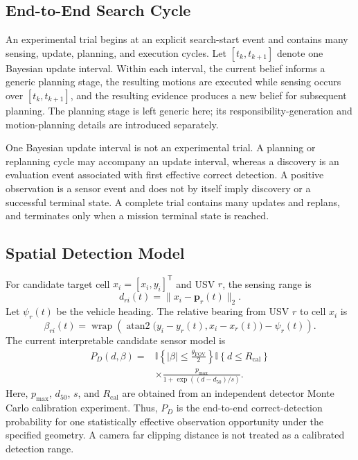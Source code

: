 \documentclass[letterpaper, 10pt, conference]{ieeeconf}
\begin{document}
\subsection{End-to-End Search Cycle}

An experimental trial begins at an explicit search-start event and contains many sensing, update, planning, and execution cycles. Let \([t_k,t_{k+1}]\) denote one Bayesian update interval. Within each interval, the current belief informs a generic planning stage, the resulting motions are executed while sensing occurs over \([t_k,t_{k+1}]\), and the resulting evidence produces a new belief for subsequent planning. The planning stage is left generic here; its responsibility-generation and motion-planning details are introduced separately.

One Bayesian update interval is not an experimental trial. A planning or replanning cycle may accompany an update interval, whereas a discovery is an evaluation event associated with first effective correct detection. A positive observation is a sensor event and does not by itself imply discovery or a successful terminal state. A complete trial contains many updates and replans, and terminates only when a mission terminal state is reached.

\subsection{Spatial Detection Model}

For candidate target cell \(x_i=[x_i,y_i]^\mathsf{T}\) and USV \(r\), the sensing range is
\begin{equation}
  d_{ri}(t) = \lVert x_i - \mathbf{p}_r(t) \rVert_2.
  \label{eq:sensing_range}
\end{equation}
Let \(\psi_r(t)\) be the vehicle heading. The relative bearing from USV \(r\) to cell \(x_i\) is
\begin{equation}
  \beta_{ri}(t) = \operatorname{wrap}\!\left(
  \operatorname{atan2}\!\bigl(y_i-y_r(t),x_i-x_r(t)\bigr)-\psi_r(t)\right).
  \label{eq:relative_bearing}
\end{equation}
The current interpretable candidate sensor model is
\begin{equation}
  \begin{aligned}
    P_D(d,\beta) ={}& \mathbb{I}\!\left\{\lvert\beta\rvert \leq \frac{\theta_{\mathrm{FOV}}}{2}\right\}
    \mathbb{I}\!\left\{d \leq R_{\mathrm{cal}}\right\} \\
    &\times \frac{p_{\max}}{1+\exp\!\left((d-d_{50})/s\right)}.
  \end{aligned}
  \label{eq:spatial_detection_model}
\end{equation}
Here, \(p_{\max}\), \(d_{50}\), \(s\), and \(R_{\mathrm{cal}}\) are obtained from an independent detector Monte Carlo calibration experiment. Thus, \(P_D\) is the end-to-end correct-detection probability for one statistically effective observation opportunity under the specified geometry. A camera far clipping distance is not treated as a calibrated detection range.
\end{document}
